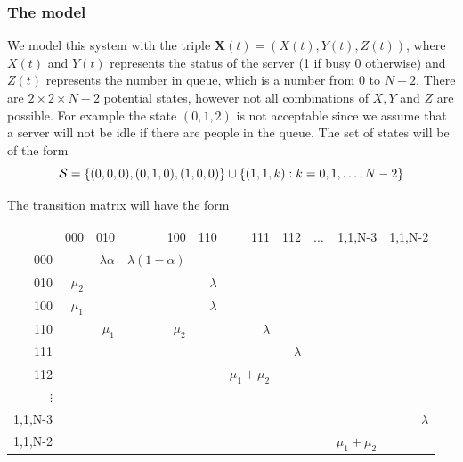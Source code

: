 \documentclass[11pt,letterpaper]{article}
\newcommand{\cS}{{\cal S}}
\begin{document}
\subsubsection{The model}
\newcommand{\bX}{\ensuremath{\mathbf X}} We model this system with the triple
$\bX(t) = (X(t),Y(t),Z(t))$, where $X(t)$ and $Y(t)$ represents the status of
the server (1 if busy 0 otherwise) and $Z(t)$ represents the number in queue,
which is a number from 0 to $N-2$. There are $2 \times 2\times N-2$ potential
states, however not all combinations of $X,Y$ and $Z$ are possible. For example
the state $(0,1,2)$ is not acceptable since we assume that a server will not be
idle if there are people in the queue. The set of states will be of the form
\[\cS=\{(0,0,0),(0,1,0),(1,0,0)\} \cup \{(1,1,k): k=
0,1,\ldots,N-2\}\]

The transition matrix will have the form


\begin{tabular}{r|r|r|r|r|r|r|r|r|r|}

         &     000 &             010 &             100 &      110  &             111 &             112 &        $\ldots$ &         1,1,N-3 &        1,1,N-2 \\
\cline{2-10}
     000 &         & $\lambda\alpha$ & $\lambda(1-\alpha)$ &                 &                 &                 &                 &                 &                 \\
\cline{2-10}
     010 & $\mu_2$ &                 &                 & $\lambda$ &                 &                 &                 &                 &                 \\
\cline{2-10}
     100 & $\mu_1$ &                 &                 & $\lambda$ &                 &                 &                 &                 &                 \\
\cline{2-10}
     110 &         &         $\mu_1$ &         $\mu_2$ &           &       $\lambda$ &                 &                 &                 &                 \\
\cline{2-10}
     111 &         &                 &                 &           &                 &       $\lambda$ &                 &                 &                 \\
\cline{2-10}
     112 &         &                 &                 &           &   $\mu_1+\mu_2$ &                 &                 &                 &                 \\
\cline{2-10}
$\vdots$ &         &                 &                 &           &                 &                 &                 &                 &                 \\
\cline{2-10}
 1,1,N-3 &         &                 &                 &           &                 &                 &                 &                 &       $\lambda$ \\
\cline{2-10}
 1,1,N-2 &         &                 &                 &           &                 &                 &                 &   $\mu_1+\mu_2$ &                 \\
\cline{2-10}
\end{tabular}
\end{document}
